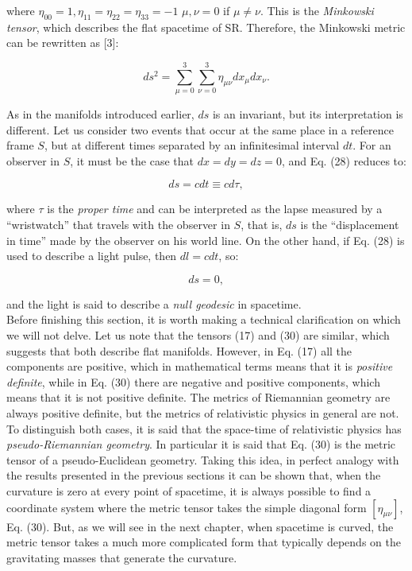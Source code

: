 \documentclass[11pt,letterpaper]{article}
\begin{document}
where $\eta_{00}=1, \eta_{11}=\eta_{22}=\eta_{33}=-1$ $\mu,\nu =0$ if $\mu \neq \nu$. This is the \textit{Minkowski tensor}, which describes the flat spacetime of SR. Therefore, the Minkowski metric can be rewritten as [3]:

\begin{equation}%
ds^{2} = \sum_{\mu=0}^{3} \sum_{\nu=0}^{3} \eta_{\mu \nu}dx_{\mu}dx_{\nu}.
\end{equation}

As in the manifolds introduced earlier, $ds$ is an invariant, but its interpretation is different. Let us consider two events that occur at the same place in a reference frame $S$, but at different times separated by an infinitesimal interval $dt$. For an observer in $S$, it must be the case that $dx=dy=dz=0$, and Eq. (28) reduces to:

\begin{equation}%
ds=cdt \equiv cd\tau,
\end{equation}

where $\tau$ is the \textit{proper time} and can be interpreted as the lapse measured by a “wristwatch” that travels with the observer in $S$, that is, $ds$ is the “displacement in time” made by the observer on his world line. On the other hand, if Eq. (28) is used to describe a light pulse, then $dl=cdt$, so:

\begin{equation}%
ds = 0,
\end{equation}

and the light is said to describe a \textit{null geodesic} in spacetime.\\

Before finishing this section, it is worth making a technical clarification on which we will not delve. Let us note that the tensors (17) and (30) are similar, which suggests that both describe flat manifolds. However, in Eq. (17) all the components are positive, which in mathematical terms means that it is \textit{positive definite}, while in Eq. (30) there are negative and positive components, which means that it is not positive definite. The metrics of Riemannian geometry are always positive definite, but the metrics of relativistic physics in general are not. To distinguish both cases, it is said that the space-time of relativistic physics has \textit{pseudo-Riemannian geometry}. In particular it is said that Eq. (30) is the metric tensor of a pseudo-Euclidean geometry. Taking this idea, in perfect analogy with the results presented in the previous sections it can be shown that, when the curvature is zero at every point of spacetime, it is always possible to find a coordinate system where the metric tensor takes the simple diagonal form $\left[ \eta_{\mu \nu} \right]$, Eq. (30). But, as we will see in the next chapter, when spacetime is curved, the metric tensor takes a much more complicated form that typically depends on the gravitating masses that generate the curvature.\\
\end{document}
